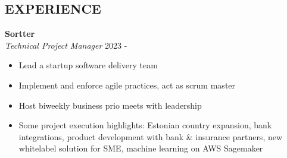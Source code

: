 \documentclass[margin, 10pt]{res} %
\begin{document}
\begin{resume}

%
%

 
\section{EXPERIENCE}
  
\textbf{Sortter}\\
{\sl Technical Project Manager} \hfill 2023 -  \\
\begin{itemize}
	\item Lead a startup software delivery team
	\item Implement and enforce agile practices, act as scrum master
	\item Host biweekly business prio meets with leadership
	\item Some project execution highlights: Estonian country expansion, bank integrations, product development with bank \& insurance partners, new whitelabel solution for SME,  machine learning on AWS Sagemaker
\end{itemize}


\end{resume}
\end{document}
